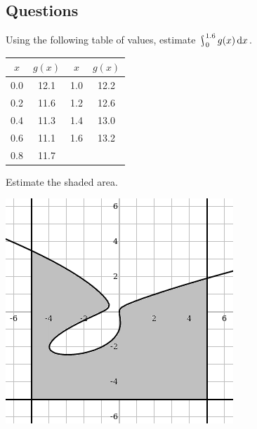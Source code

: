 \subsection*{Questions}
\begin{questions}
  \question Using the following table of values, estimate $ \rint^{1.6}_0 g(x) \dif{x} $.
            \begin{center}
              \begin{tabular}{|c|c||c|c|}\hline
                $ x $ & $ g(x) $ & $ x $ & $ g(x) $\\\hline
                0.0 & 12.1 & 1.0 & 12.2\\
                0.2 & 11.6 & 1.2 & 12.6\\
                0.4 & 11.3 & 1.4 & 13.0\\
                0.6 & 11.1 & 1.6 & 13.2\\
                0.8 & 11.7 &&\\\hline
              \end{tabular}
            \end{center}
  \question Estimate the shaded area.
            \begin{center}
              \includegraphics[width=0.3\linewidth]{aahw}
            \end{center}
\end{questions}


